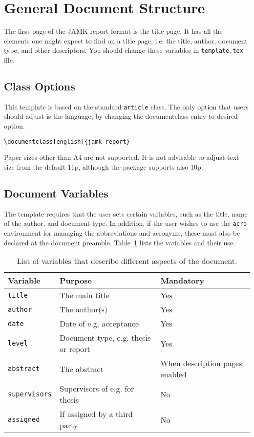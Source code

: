 \documentclass[english]{jamk-report}
\begin{document}
\section{General Document Structure}

The first page of the JAMK report format is the title page. It has all the
elements one might expect to find on a title page, i.e. the title, author,
document type, and other descriptors. You should change these variables
in \texttt{template.tex} file.

\subsection{Class Options}

This template is based on the standard \texttt{article} class. The only option
that users should adjust is the language, by changing the documentclass entry
to desired option.

\begin{verbatim}
\documentclass[english]{jamk-report}
\end{verbatim}

\noindent
Paper sizes other than A4 are not supported. It is not advisable to adjust text
size from the default 11p, although the package supports also 10p.

\subsection{Document Variables}

The template requires that the user sets certain variables, such as the title,
name of the author, and document type. In addition, if the user wishes to use
the \texttt{acro} environment for managing the abbreviations and acronyms, these
must also be declared at the document preamble. Table~\ref{table:vars} lists
the variables and their use.



\begin{table}[h]\centering
{}
    \begin{tabularx}{\textwidth-1em}{p{6em}l>{\raggedleft\arraybackslash}X} \toprule
        Variable & Purpose & Mandatory  \\ \midrule
        \texttt{title} & The main title & Yes \\
        \texttt{author} & The author(s) & Yes \\
        \texttt{date} & Date of e.g. acceptance & Yes \\
        \texttt{level} & Document type, e.g. thesis or report & Yes \\
        \texttt{abstract} & The abstract & When description pages enabled \\
        \texttt{supervisors} & Supervisors of e.g. for thesis & No \\
        \texttt{assigned} & If assigned by a third party & No \\

        \bottomrule
    \end{tabularx}
\caption{List of variables that describe different aspects of the document.}
\label{table:vars}
\end{table}
\end{document}
